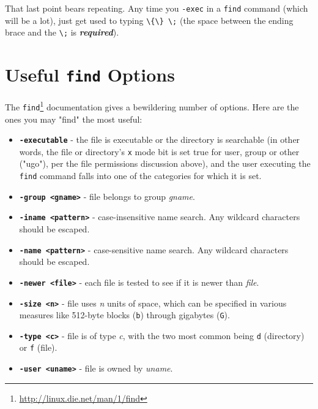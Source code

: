 \documentclass[10pt,american,]{book}
\renewcommand{\href}[2]{#2\footnote{\url{#1}}}
\numberwithin{figure}{chapter}
\begin{document}
That last point bears repeating. Any time you \texttt{-exec} in a
\texttt{find} command (which will be a lot), just get used to typing
\texttt{\textbackslash{}\{\textbackslash{}\}\ \textbackslash{};} (the
space between the ending brace and the \texttt{\textbackslash{};} is
\textbf{\emph{required}}).

\section*{\texorpdfstring{Useful \texttt{find}
Options}{Useful find Options}}\label{useful-find-options}

The \href{http://linux.die.net/man/1/find}{\texttt{find}} documentation
gives a bewildering number of options. Here are the ones you may "find"
the most useful:

\begin{itemize}
\item
  \textbf{\texttt{-executable}} - the file is executable or the
  directory is searchable (in other words, the file or directory's
  \texttt{x} mode bit is set true for user, group or other ("ugo"), per
  the file permissions discussion above), and the user executing the
  \texttt{find} command falls into one of the categories for which it is
  set.
\item
  \textbf{\texttt{-group\ \textless{}gname\textgreater{}}} - file
  belongs to group \emph{gname}.
\item
  \textbf{\texttt{-iname\ \textless{}pattern\textgreater{}}} -
  case-insensitive name search. Any wildcard characters should be
  escaped.
\item
  \textbf{\texttt{-name\ \textless{}pattern\textgreater{}}} -
  case-sensitive name search. Any wildcard characters should be escaped.
\item
  \textbf{\texttt{-newer\ \textless{}file\textgreater{}}} - each file is
  tested to see if it is newer than \emph{file}.
\item
  \textbf{\texttt{-size\ \textless{}n\textgreater{}}} - file uses
  \emph{n} units of space, which can be specified in various measures
  like 512-byte blocks (\texttt{b}) through gigabytes (\texttt{G}).
\item
  \textbf{\texttt{-type\ \textless{}c\textgreater{}}} - file is of type
  \emph{c}, with the two most common being \texttt{d} (directory) or
  \texttt{f} (file).
\item
  \textbf{\texttt{-user\ \textless{}uname\textgreater{}}} - file is
  owned by \emph{uname}.
\end{itemize}
\end{document}
